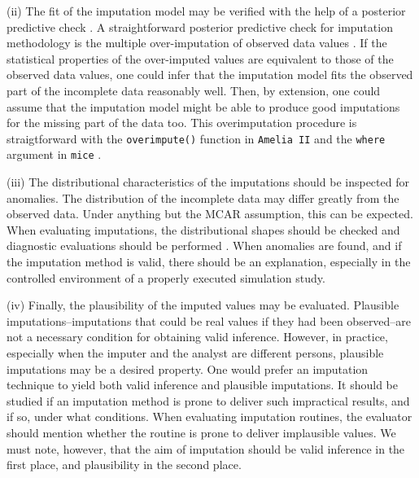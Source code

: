 \documentclass[bimj,fleqn]{w-art}
\begin{document}
(ii) The fit of the imputation model may be verified with the help of a posterior predictive check \citep[][]{nguy17, zhao22}. A straightforward posterior predictive check for imputation methodology is the multiple over-imputation of observed data values \citep{caiPPC}. If the statistical properties of the over-imputed values are equivalent to those of the observed data values, one could infer that the imputation model fits the observed part of the incomplete data reasonably well. Then, by extension, one could assume that the imputation model might be able to produce good imputations for the missing part of the data too. This overimputation procedure is straigtforward with the \texttt{overimpute()} function in \texttt{Amelia II} \citep{amelia} and the \texttt{where} argument in \texttt{mice} \citep{mice, caiPPC}.

(iii) The distributional characteristics of the imputations should be inspected for anomalies. The distribution of the incomplete data may differ greatly from the observed data. Under anything but the MCAR assumption, this can be expected. When evaluating imputations, the distributional shapes should be checked and diagnostic evaluations should be performed \citep[see][for a detailed overview of diagnostic evaluation for multivariate imputations]{abayomi2008diagnostics}. When anomalies are found, and if the imputation method is valid, there should be an explanation, especially in the controlled environment of a properly executed simulation study. 

(iv) Finally, the plausibility of the imputed values may be evaluated. Plausible imputations--imputations that could be real values if they had been observed--are not a necessary condition for obtaining valid inference. However, in practice, especially when the imputer and the analyst are different persons, plausible imputations may be a desired property. One would prefer an imputation technique to yield both valid inference and plausible imputations. It should be studied if an imputation method is prone to deliver such impractical results, and if so, under what conditions. When evaluating imputation routines, the evaluator should mention whether the routine is prone to deliver implausible values. We must note, however, that the aim of imputation should be valid inference in the first place, and plausibility in the second place. 
\end{document}
